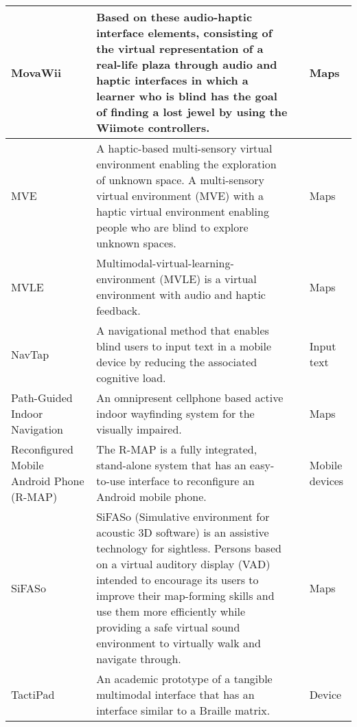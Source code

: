 \begin{small}
\begin{longtable}[h]{m{2.5cm}m{5cm}m{3cm}m{2cm}}
            MovaWii & Based on these audio-haptic interface elements, consisting of the virtual representation of a real-life plaza through audio and haptic interfaces in which a learner who is blind has the goal of finding a lost jewel by using the Wiimote controllers. & {\tiny \cite{Sanchez2014Multimodal,SanchezVideogaming}} & Maps \\ \hline
            
            MVE & A haptic-based multi-sensory virtual environment enabling the exploration of unknown space. A multi-sensory virtual environment (MVE) with a haptic virtual environment enabling people who are blind to explore unknown spaces. & {\tiny \cite{Lahav2008Construction,Lahav2004}} & Maps \\ \hline
            
            MVLE & Multimodal-virtual-learning-environment (MVLE) is a virtual environment with audio and haptic feedback. & {\tiny \cite{Lahav2005}} & Maps \\ \hline
            
            NavTap & A navigational method that enables blind users to input text in a mobile device by reducing the associated cognitive load. & {\tiny \cite{Guerreiro2009}} & Input text \\ \hline
            
            Path-Guided Indoor Navigation & An omnipresent cellphone based active indoor wayfinding system for the visually impaired. & {\tiny \cite{Jain2014}} & Maps \\ \hline
            
            Reconfigured Mobile Android Phone (R-MAP) & The R-MAP is a fully integrated, stand-alone system that has an easy-to-use interface to reconfigure an Android mobile phone. & {\tiny \cite{Hossain2011}} & Mobile devices \\ \hline
            
            SiFASo & SiFASo (Simulative environment for acoustic 3D software) is an assistive technology for sightless. Persons based on a virtual auditory display (VAD) intended to encourage its users to improve their map-forming skills and use them more efficiently while providing a safe virtual sound environment to virtually walk and navigate through. & {\tiny \cite{Ohuchi2006}} & Maps \\ \hline
            
            TactiPad & An academic prototype of a tangible multimodal interface that has an interface similar to a Braille matrix. & {\tiny \cite{Pissaloux2018a}} & Device \\ \hline
            

\end{longtable}
\end{small}
